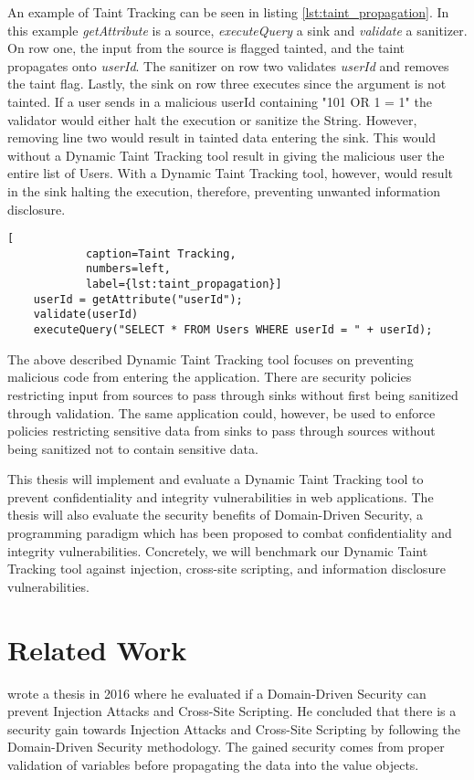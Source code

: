 \documentclass{../kththesis}
\begin{document}
	An example of Taint Tracking can be seen in listing \ref{lst:taint_propagation}. In this example \textit{getAttribute} is a source, \textit{executeQuery} a sink and \textit{validate} a sanitizer. On row one, the input from the source is flagged tainted, and the taint propagates onto \textit{userId}. The sanitizer on row two validates \textit{userId} and removes the taint flag. Lastly, the sink on row three executes since the argument is not tainted. If a user sends in a malicious userId containing "101 OR 1 = 1" the validator would either halt the execution or sanitize the String. However, removing line two would result in tainted data entering the sink. This would without a Dynamic Taint Tracking tool result in giving the malicious user the entire list of Users. With a Dynamic Taint Tracking tool, however, would result in the sink halting the execution, therefore, preventing unwanted information disclosure.
	
	\begin{lstlisting}[
			caption=Taint Tracking,
			numbers=left,
			label={lst:taint_propagation}]
	userId = getAttribute("userId");
	validate(userId)
	executeQuery("SELECT * FROM Users WHERE userId = " + userId);
	\end{lstlisting}
	
	The above described Dynamic Taint Tracking tool focuses on preventing malicious code from entering the application. There are security policies restricting input from sources to pass through sinks without first being sanitized through validation. The same application could, however, be used to enforce policies restricting sensitive data from sinks to pass through sources without being sanitized not to contain sensitive data. 
	
	This thesis will implement and evaluate a Dynamic Taint Tracking tool to prevent confidentiality and integrity vulnerabilities in web applications. The thesis will also evaluate the security benefits of Domain-Driven Security, a programming paradigm which has been proposed to combat confidentiality and integrity vulnerabilities. Concretely, we will benchmark our Dynamic Taint Tracking tool against injection, cross-site scripting, and information disclosure vulnerabilities.
	
	
	\section{Related Work}
	\textcite{Stendahl2016} wrote a thesis in 2016 where he evaluated if a Domain-Driven Security can prevent Injection Attacks and Cross-Site Scripting. He concluded that there is a security gain towards Injection Attacks and Cross-Site Scripting by following the Domain-Driven Security methodology. The gained security comes from proper validation of variables before propagating the data into the value objects.
	
\end{document}
